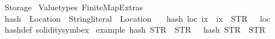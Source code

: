 %
\begin{isabellebody}%
%
%
\isadelimdocument
%
\endisadelimdocument
%
\isatagdocument
%
\isamarkuptrue%
%
\endisatagdocument
{\isafolddocument}%
%
\isadelimdocument
%
\endisadelimdocument
%
\isadelimtheory
%
\endisadelimtheory
%
\isatagtheory
{}\isamarkupfalse%
\ Storage\isanewline
{}\ Valuetypes\ Finite{\isacharunderscore}{\kern0pt}Map{\isacharunderscore}{\kern0pt}Extras\isanewline
\isanewline
{}%
\endisatagtheory
{\isafoldtheory}%
%
\isadelimtheory
%
\endisadelimtheory
%
\isadelimdocument
%
\endisadelimdocument
%
\isatagdocument
%
\isamarkuptrue%
%
\endisatagdocument
{\isafolddocument}%
%
\isadelimdocument
%
\endisadelimdocument
{}\isamarkupfalse%
\ hash\ {\isacharcolon}{\kern0pt}{\isacharcolon}{\kern0pt}\ {\isachardoublequoteopen}Location\ {\isasymRightarrow}\ String{\isachardot}{\kern0pt}literal\ {\isasymRightarrow}\ Location{\isachardoublequoteclose}\isanewline
\ \ \ {\isachardoublequoteopen}hash\ loc\ ix\ {\isacharequal}{\kern0pt}\ ix\ {\isacharplus}{\kern0pt}\ {\isacharparenleft}{\kern0pt}STR\ {\isacharprime}{\kern0pt}{\isacharprime}{\kern0pt}{\isachardot}{\kern0pt}{\isacharprime}{\kern0pt}{\isacharprime}{\kern0pt}\ {\isacharplus}{\kern0pt}\ loc{\isacharparenright}{\kern0pt}{\isachardoublequoteclose}\isanewline
\isanewline
{}\isamarkupfalse%
\ hash{\isacharunderscore}{\kern0pt}def\ {\isacharbrackleft}{\kern0pt}solidity{\isacharunderscore}{\kern0pt}symbex{\isacharbrackright}{\kern0pt}\isanewline
\isanewline
{}\isamarkupfalse%
\ example{\isacharcolon}{\kern0pt}\ {\isachardoublequoteopen}hash\ {\isacharparenleft}{\kern0pt}STR\ {\isacharprime}{\kern0pt}{\isacharprime}{\kern0pt}{}{\isachardot}{\kern0pt}{}{\isacharprime}{\kern0pt}{\isacharprime}{\kern0pt}{\isacharparenright}{\kern0pt}\ {\isacharparenleft}{\kern0pt}STR\ {\isacharprime}{\kern0pt}{\isacharprime}{\kern0pt}{}{\isacharprime}{\kern0pt}{\isacharprime}{\kern0pt}{\isacharparenright}{\kern0pt}\ {\isacharequal}{\kern0pt}\ hash\ {\isacharparenleft}{\kern0pt}STR\ {\isacharprime}{\kern0pt}{\isacharprime}{\kern0pt}{}{\isacharprime}{\kern0pt}{\isacharprime}{\kern0pt}{\isacharparenright}{\kern0pt}\ {\isacharparenleft}{\kern0pt}STR\ {\isacharprime}{\kern0pt}{\isacharprime}{\kern0pt}{}{\isachardot}{\kern0pt}{}{\isacharprime}{\kern0pt}{\isacharprime}{\kern0pt}{\isacharparenright}{\kern0pt}{\isachardoublequoteclose}%

\end{isabellebody}
